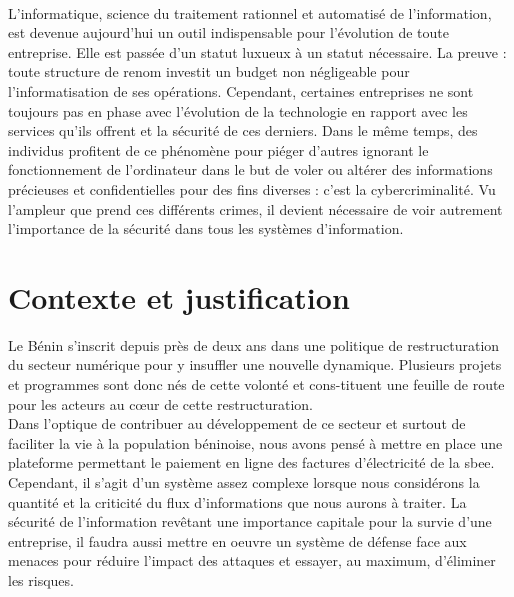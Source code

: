 \introduction
    \paragraph{}
      \small{
      L'informatique, science du traitement rationnel et automatisé de l'information, est devenue aujourd'hui un outil indispensable pour l'évolution de toute entreprise. Elle est passée d'un statut luxueux à un statut nécessaire. La preuve : toute structure de renom investit un budget non n\'egligeable pour l'informatisation de ses opérations. Cependant, certaines entreprises ne sont toujours pas en phase avec l'\'evolution de la technologie en rapport avec les services qu'ils offrent et la s\'ecurit\'e de ces derniers. Dans le m\^eme temps, des individus profitent de ce ph\'enom\`ene pour pi\'eger d'autres ignorant le fonctionnement de l'ordinateur dans le but de voler ou alt\'erer des informations précieuses et confidentielles pour des fins diverses : c'est la cybercriminalité. Vu l'ampleur que prend ces diff\'erents crimes, il devient n\'ecessaire de voir autrement l'importance de la s\'ecurit\'e dans tous les syst\`emes d'information.
    
    \section{Contexte et justification}
	Le Bénin s’inscrit depuis pr\`es de deux ans dans une politique de restructuration du secteur numérique pour y insuffler une nouvelle dynamique. Plusieurs projets et programmes sont donc nés de cette volonté et cons-tituent une feuille de route pour les acteurs au cœur de cette restructuration. 
	\\Dans l'optique de contribuer au d\'eveloppement de ce secteur et surtout de faciliter la vie \`a la population b\'eninoise, nous avons pens\'e \`a mettre en place une plateforme permettant le paiement en ligne des factures d'\'electricit\'e de la \gls{sbee}. Cependant, il s'agit d'un syst\`eme assez complexe lorsque nous consid\'erons la quantit\'e et la criticit\'e du flux d'informations que nous aurons \`a traiter. La sécurité de l'information revêtant une importance capitale pour la survie d'une entreprise, il faudra aussi mettre en oeuvre un système de défense face aux menaces pour réduire l'impact des attaques et essayer, au maximum, d'éliminer les risques.
	}
    

